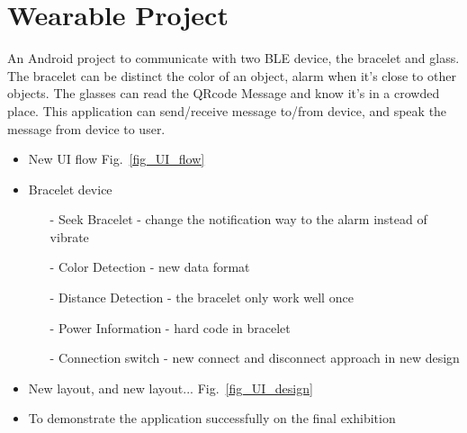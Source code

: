 \section{Wearable Project}
\label{project}
    An Android project to communicate with two BLE device, the bracelet and glass.
    The bracelet can be distinct the color of an object, alarm when it's close to other objects.
    The glasses can read the QRcode Message and know it's in a crowded place.
    This application can send/receive message to/from device, and speak the message from device to user.
    \begin{itemize}
        \item {New UI flow} Fig.~\ref{fig_UI_flow}
        \item {Bracelet device}
        \begin{itemize}    
            \item[-]{Seek Bracelet - change the notification way to the alarm instead of vibrate}
            \item[-]{Color Detection - new data format}
            \item[-]{Distance Detection - the bracelet only work well once}
            \item[-]{Power Information - hard code in bracelet}
            \item[-]{Connection switch - new connect and disconnect approach in new design}
        \end{itemize}
        \item {New layout, and new layout...} Fig.~\ref{fig_UI_design}
        \item {To demonstrate the application successfully  on the final exhibition}
    \end{itemize}
    
    
